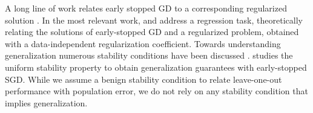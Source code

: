 A long line of work relates early stopped GD
to a corresponding regularized solution
\citep{friedman2003gradient, yao2007early, suggala2018connecting, ali2018continuous,neu2018iterate,ali2020implicit}. 
In the most relevant work, 
\citet{ali2018continuous} and \citet{suggala2018connecting} %
address a regression task, 
theoretically relating
the solutions of early-stopped GD 
and a regularized problem, 
obtained with a data-independent 
regularization coefficient.  
% 
% 
Towards understanding generalization
numerous stability conditions 
have been discussed 
\citep{kearns1999algorithmic, bousquet2002stability, mukherjee2006learning, shalev2010learnability}. 
\citet{hardt2016train} studies the uniform stability property 
to obtain generalization guarantees with early-stopped SGD. 
% 
While we assume a benign stability condition
to relate leave-one-out performance with population error, 
we do not rely on any stability condition
that implies generalization.





% 
% 













